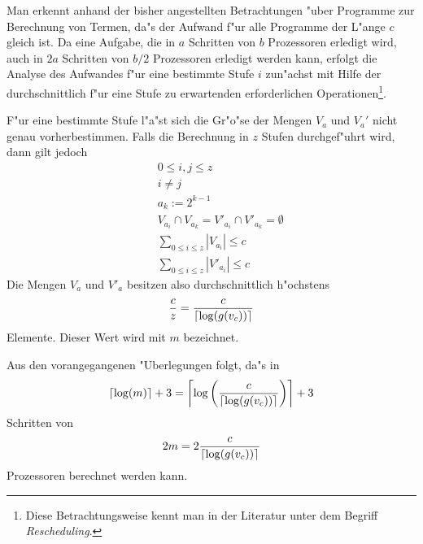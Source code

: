 Man erkennt anhand der bisher angestellten Betrachtungen "uber Programme
zur Berechnung von Termen, da"s der Aufwand f"ur alle Programme der
L"ange $c$ gleich ist. Da eine Aufgabe, die in $a$ Schritten von 
$b$ Prozessoren erledigt wird, auch in $2a$ Schritten von $b/2$ 
Prozessoren erledigt werden kann, erfolgt die Analyse des Aufwandes 
f"ur eine bestimmte Stufe $i$ zun"achst mit Hilfe der durchschnittlich f"ur
eine Stufe zu erwartenden erforderlichen Operationen\footnote{Diese 
Betrachtungsweise kennt man in der Literatur unter dem Begriff 
{\em Rescheduling}.}.

F"ur eine bestimmte Stufe l"a"st sich die Gr"o"se der Mengen $V_a$ und
$V_a'$ nicht genau vorherbestimmen. Falls die Berechnung in $z$ Stufen 
durchgef"uhrt wird, dann gilt jedoch
\begin{eqnarray*}
    & & 0 \leq i,j \leq z \\
    & & i \neq j \\
    & & a_k := 2^{k-1} \\
    & & V_{a_i} \cap V_{a_k} = V'_{a_i} \cap V'_{a_k} = \emptyset \\
    & & \sum_{0 \leq i \leq z} |V_{a_i}| \leq c \\
    & & \sum_{0 \leq i \leq z} |V'_{a_i}| \leq c 
\end{eqnarray*}
Die Mengen $V_a$ und $V'_a$ besitzen also durchschnittlich h"ochstens
\[ \frac{c}{z} = \frac{c}{ \left\lceil \log(g(v_c)) \right\rceil } \]
Elemente. Dieser Wert wird mit $m$ bezeichnet.

Aus den vorangegangenen "Uberlegungen folgt, da"s  in
\[ \left\lceil \log(m) \right\rceil + 3 =
   \left\lceil \log \left( \frac{c}{ \left\lceil \log(g(v_c)) \right\rceil } \right) \right\rceil + 3
\]
Schritten von
\[ 2m = 2 \frac{c}{ \left\lceil \log(g(v_c)) \right\rceil } \] 
Prozessoren berechnet werden kann.

